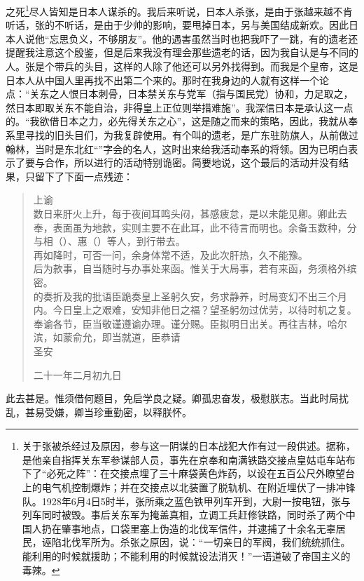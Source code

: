 之死\footnote{关于张被杀经过及原因，参与这一阴谋的日本战犯大作有过一段供述。据称，是他亲自指挥关东军参谋部人员，事先在京奉和南满铁路交接点皇姑屯车站布下了“必死之阵”：在交接点埋了三十麻袋黄色炸药，以设在五百公尺外瞭望台上的电气机控制爆炸；并在交接点以北装置了脱轨机、在附近埋伏了一排冲锋队。1928年6月4日5时半，张所乘之蓝色铁甲列车开到，大尉一按电钮，张与列车同时被毁。事后关东军为掩盖真相，立调工兵赶修铁路，同时杀了两个中国人扔在肇事地点，口袋里塞上伪造的北伐军信件，并逮捕了十余名无辜居民，诬陷北伐军所为。杀张之原因，说：“一切亲日的军阀，我们统统抓住。能利用的时候就援助；不能利用的时候就设法消灭！”一语道破了帝国主义的毒辣。}尽人皆知是日本人谋杀的。我后来听说，日本人杀张，是由于张越来越不肯听话，张的不听话，是由于少帅的影响，要甩掉日本，另与美国结成新欢。因此日本人说他“忘思负义，不够朋友”。他的遇害虽然当时也把我吓了一跳，有的遗老还提醒我注意这个殷鉴，但是后来我没有理会那些遗老的话，因为我自认是与不同的人。张是个带兵的头目，这样的人除了他还可以另外找得到。而我是个皇帝，这是日本人从中国人里再找不出第二个来的。那时在我身边的人就有这样一个论点：“关东之人恨日本刺骨，日本禁关东与党军（指与国民党）协和，力足取之，然日本即取关东不能自治，非得皇上正位则举措难施”。我深信日本是承认这一点的。“我欲借日本之力，必先得关东之心”，这是随之而来的策略，因此，我就从奉系里寻找的旧头目们，为我复辟使用。有个叫的遗老，是广东驻防旗人，从前做过翰林，当时是东北红“”字会的名人，这时出来给我活动奉系的将领。因为已明白表示了要与合作，所以进行的活动特别诡密。简要地说，这个最后的活动并没有结果，只留下了下面一点残迹：\\

\begin{quote}
	上谕\\

数日来肝火上升，每于夜间耳鸣头闷，甚感疲怠，是以未能见卿。卿此去奉，表面虽为地款，实则主要不在此耳，此不待言而明也。余备玉数种，分与相（）、惠（）等人，到行带去。\\

再如降时，可否一问，余身体常不适，及此次肝热，久不能豫。\\

后为款事，自当随时与办事处来函。惟关于大局事，若有来函，务须格外缤密。\\

的奏折及我的批语臣跪奏皇上圣躬久安，务求静养，时局变幻不出三个月内。今日皇上之艰难，安知非他日之福？望圣躬勿过优劳，以待时机之复。奉谕各节，臣当敬谨遵谕办理。谨分赐。臣拟明日出关。再往吉林，哈尔滨，如蒙俞允，即当就道，臣恭请\\

圣安\\

\begin{flushright}
	二十一年二月初九日\\
\end{flushright}
\end{quote}

此去甚是。惟须借何题目，免启学良之疑。卿孤忠奋发，极慰朕志。当此时局扰乱，甚易受嫌，卿当珍重勤密，以释朕怀。
